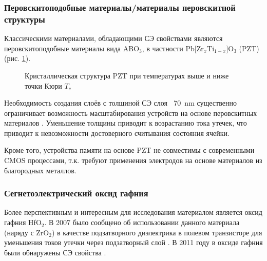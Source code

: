 \subsubsection{Перовскитоподобные материалы/материалы перовскитной структуры}
Классическими материалами, обладающими СЭ свойствами являются перовскитоподобные материалы вида ABO\(_3\), в частности Pb[Zr\(_x\)Ti\(_{1-x}\)]O\(_3\) (PZT) (рис. \cref{fig:pzt}).
\begin{figure}[ht]
    \caption{Кристаллическая структура PZT при температурах выше и ниже точки Кюри \(T_c\)}\label{fig:pzt}
\end{figure}

Необходимость создания слоёв с толщиной СЭ слоя \(~\) \SI{70}{\nano\meter} существенно ограничивает возможность масштабирования устройств на основе перовскитных материалов \cite{parkReviewPerspectiveFerroelectric2018}. Уменьшение толщины приводит к возрастанию тока утечек, что приводит к невозможности достоверного считывания состояния ячейки.

Кроме того, устройства памяти на основе PZT не совместимы с современными CMOS процессами, т.к. требуют применения электродов на основе материалов из благородных металлов.

\subsubsection{Сегнетоэлектрический оксид гафния}\label{sec:ch2/sec1}
Более перспективным и интересным для исследования материалом является оксид гафния HfO\(_2\). В 2007 было сообщено об использовании данного материала (наряду с ZrO\(_2\)) в качестве подзатворного диэлектрика в полевом транзисторе для уменьшения токов утечки через подзатворный слой \cite{bohrHighkSolution2007}. В 2011 году в оксиде гафния были обнаружены СЭ свойства \cite{bosckeFerroelectricityHafniumOxide2011}.

